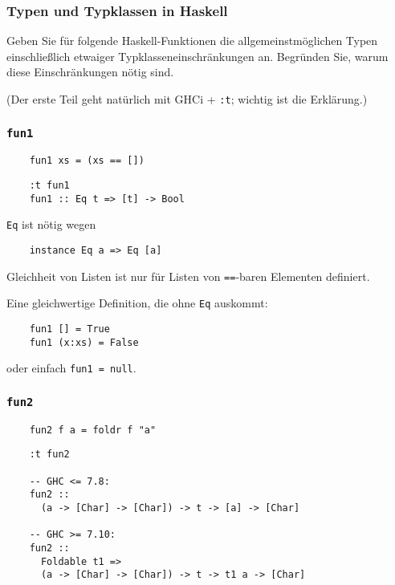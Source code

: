 \documentclass{beamer}
\date{2016-11-21/22}
\begin{document}
\normalsize
\normalem

\begin{frame}[plain]
  \titlepage
\end{frame}

\begin{frame}
  \frametitle{Typen und Typklassen in Haskell}
  Geben Sie für folgende Haskell-Funktionen die allgemeinstmöglichen Typen einschließlich etwaiger Typklasseneinschränkungen an.
  Begründen Sie, warum diese Einschränkungen nötig sind.
  
  (Der erste Teil geht natürlich mit GHCi + \texttt{:t}; wichtig ist die Erklärung.)
\end{frame}

\begin{frame}[fragile]
  \frametitle{\lstinline{fun1}}
  \begin{lstlisting}
    fun1 xs = (xs == [])
  \end{lstlisting}
  \pause
  \begin{lstlisting}
    :t fun1
    fun1 :: Eq t => [t] -> Bool
  \end{lstlisting}
  \pause
  \lstinline{Eq} ist nötig wegen
  \begin{lstlisting}
    instance Eq a => Eq [a]
  \end{lstlisting}
  Gleichheit von Listen ist nur für Listen von \lstinline{==}-baren Elementen definiert.
  
  \pause
  Eine gleichwertige Definition, die ohne \lstinline{Eq} auskommt:
  \begin{lstlisting}
    fun1 [] = True
    fun1 (x:xs) = False
  \end{lstlisting}
  oder einfach \lstinline{fun1 = null}.
\end{frame}

\begin{frame}[fragile]
  \frametitle{\lstinline{fun2}}
  \begin{lstlisting}
    fun2 f a = foldr f "a"
  \end{lstlisting}
  \pause
  \begin{lstlisting}
    :t fun2
    
    -- GHC <= 7.8:
    fun2 ::
      (a -> [Char] -> [Char]) -> t -> [a] -> [Char]
    
    -- GHC >= 7.10:
    fun2 ::
      Foldable t1 =>
      (a -> [Char] -> [Char]) -> t -> t1 a -> [Char]
  \end{lstlisting}
\end{frame}
\end{document}
